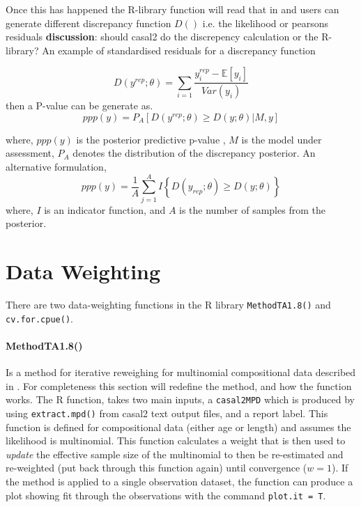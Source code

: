 \documentclass[12pt,preprint,authoryear]{article}
\begin{document}
Once this has happened the R-library function will read that in and users can generate different discrepancy function \(D()\) i.e. the likelihood or pearsons residuals \textbf{discussion}: should casal2 do the discrepency calculation or the R-library? An example of standardised residuals for a discrepancy function

\[
D\left(y^{rep}; \theta\right) =\sum_{i = 1} \frac{y_i^{rep} - \mathbb{E}[y_i]}{Var(y_i)}
\]
then a P-value can be generate as.
\[
ppp\left(y\right) = P_A\left[D\left(y^{rep}; \theta\right) \geq D\left(y;\theta\right) | M, y\right]
\]

where, \(ppp\left(y\right)\) is the posterior predictive p-value \cite{hjort2006post}, \(M\) is the model under assessment, \(P_A\) denotes the distribution of the discrepancy posterior. An alternative formulation,
\[
ppp\left(y\right) = \frac{1}{A} \sum\limits_{j = 1}^A I \left\{D\left(y_{rep}; \theta\right) \geq D\left(y;\theta\right) \right\}
\]
where, \(I\) is an indicator function, and \(A\) is the number of samples from the posterior.

\section{Data Weighting}
There are two data-weighting functions in the R library \texttt{MethodTA1.8()} and \texttt{cv.for.cpue()}.


\paragraph*{MethodTA1.8()}
Is a method for iterative reweighing for multinomial compositional data described in \cite{francis2011data}. For completeness this section will redefine the method, and how the function works. The R function, takes two main inputs, a \texttt{casal2MPD} which is produced by using \texttt{extract.mpd()} from casal2 text output files, and a report label. This function is defined for compositional data (either age or length) and assumes the likelihood is multinomial. This function calculates a weight that is then used to \textit{update} the effective sample size of the multinomial to then be re-estimated and re-weighted (put back through this function again) until convergence (\(w = 1\)). If the method is applied to a single observation dataset, the function can produce a plot showing fit through the observations with the command \texttt{plot.it = T}.
\end{document}
